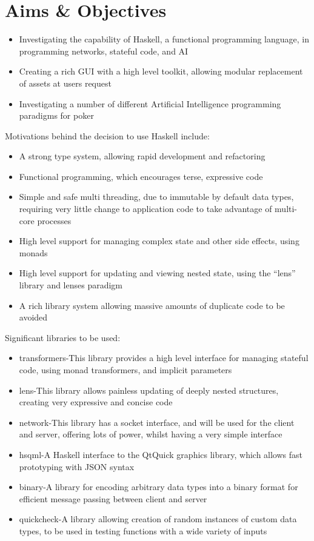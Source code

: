 \section{Aims \& Objectives}

\begin{itemize}
\item Investigating the capability of Haskell, a functional programming language, in programming networks, stateful code, and AI
\item Creating a rich GUI with a high level toolkit, allowing modular replacement of assets at users request
\item Investigating a number of different Artificial Intelligence programming paradigms for poker
\end{itemize}
Motivations behind the decision to use Haskell include:
\begin{itemize}
\item A strong type system, allowing rapid development and refactoring
\item Functional programming, which encourages terse, expressive code
\item Simple and safe multi threading, due to immutable by default data types, requiring very little change to application code to take advantage of multi-core processes
\item High level support for managing complex state and other side effects, using monads \parencite{benton2000}
\item High level support for updating and viewing nested state, using the ``lens'' library and lenses paradigm \parencite{bohannon2006}
\item A rich library system allowing massive amounts of duplicate code to be avoided
\end{itemize}
Significant libraries to be used:
\begin{itemize}
\item transformers-This library provides a high level interface for managing stateful code, using monad transformers, and implicit parameters
\item lens-This library allows painless updating of deeply nested structures, creating very expressive and concise code
\item network-This library has a socket interface, and will be used for the client and server, offering lots of power, whilst having a very simple interface
\item hsqml-A Haskell interface to the QtQuick graphics library, which allows fast prototyping with JSON syntax
\item binary-A library for encoding arbitrary data types into a binary format for efficient message passing between client and server
\item quickcheck-A library allowing creation of random instances of custom data types, to be used in testing functions with a wide variety of inputs
\end{itemize}
